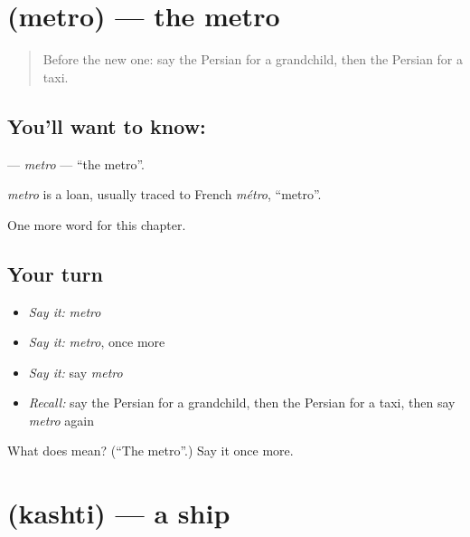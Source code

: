 \section[\texorpdfstring{\fa{مترو} (metro)}{مترو (metro)}]{ (metro) — the metro}

\label{lesson:FA-C117-metro}



\begin{quote}
Before the new one: say the Persian for a grandchild, then the Persian for a taxi.
\end{quote}

\subsection*{You'll want to know: }
\textbf{} — \emph{metro} — \textquotedblleft{}the metro\textquotedblright{}.

\begin{cousinweb}
\emph{metro} is a loan, usually traced to French \emph{métro}, \textquotedblleft{}metro\textquotedblright{}.
\end{cousinweb}

\begin{grammarlens}[title={What you've built}]
One more word for this chapter.
\end{grammarlens}

\subsection*{Your turn}
\begin{itemize}
\raggedright
  \item \emph{Say it:} \emph{metro}
  \item \emph{Say it:} \emph{metro}, once more
  \item \emph{Say it:} say \emph{metro}
  \item \emph{Recall:} say the Persian for a grandchild, then the Persian for a taxi, then say \emph{metro} again
\end{itemize}

\begin{tcolorbox}[breakable,colback=teal!4,colframe=teal!35!black,title={Before you move on}]
What does  mean? (\textquotedblleft{}The metro\textquotedblright{}.) Say it once more.
\end{tcolorbox}
\section[\texorpdfstring{\fa{کشتی} (kashti)}{کشتی (kashti)}]{ (kashti) — a ship}

